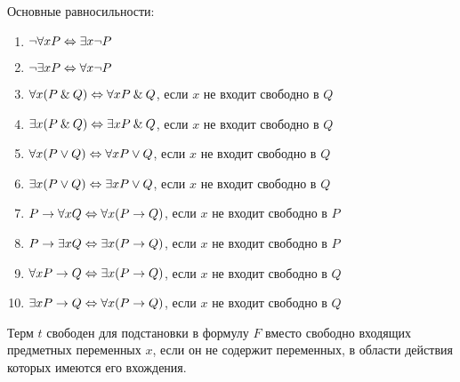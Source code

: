 \documentclass[main]{subfiles}
\begin{document}
Основные равносильности:
\begin{enumerate}
    \item $\lnot \forall x P \Leftrightarrow \exists x \lnot P$
    \item $\lnot \exists x P \Leftrightarrow \forall x \lnot P$
    \item $\forall x (P\mathbin{\&} Q) \Leftrightarrow \forall x P \mathbin{\&} Q$, если $x$ не входит свободно в $Q$
    \item $\exists x (P\mathbin{\&} Q) \Leftrightarrow \exists x P \mathbin{\&} Q$, если $x$ не входит свободно в $Q$
    \item $\forall x (P\lor Q) \Leftrightarrow \forall x P \lor Q$, если $x$ не входит свободно в $Q$
    \item $\exists x (P\lor Q) \Leftrightarrow \exists x P \lor Q$, если $x$ не входит свободно в $Q$
    \item $P \to \forall x Q \Leftrightarrow \forall x(P\to Q)$, если $x$ не входит свободно в $P$
    \item $P \to \exists x Q \Leftrightarrow \exists x(P\to Q)$, если $x$ не входит свободно в $P$
    \item $\forall x P \to Q \Leftrightarrow \exists x(P\to Q)$, если $x$ не входит свободно в $Q$
    \item $\exists x P \to Q \Leftrightarrow \forall x(P\to Q)$, если $x$ не входит свободно в $Q$
\end{enumerate}
\begin{definition}
    Терм $t$ свободен для подстановки в формулу $F$ вместо свободно входящих предметных переменных $x$, если он не содержит переменных, в области действия которых имеются его вхождения.
\end{definition}
\end{document}
